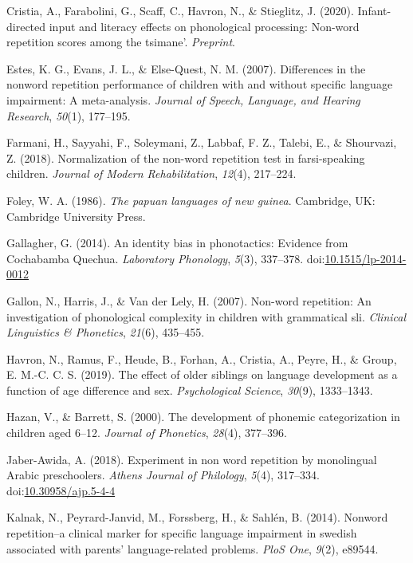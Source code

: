 \documentclass[english,,man,floatsintext]{apa6}
\begin{document}
\hypertarget{ref-cristia2020infant}{}
Cristia, A., Farabolini, G., Scaff, C., Havron, N., \& Stieglitz, J.
(2020). Infant-directed input and literacy effects on phonological
processing: Non-word repetition scores among the tsimane'.
\emph{Preprint}.

\hypertarget{ref-estes2007differences}{}
Estes, K. G., Evans, J. L., \& Else-Quest, N. M. (2007). Differences in
the nonword repetition performance of children with and without specific
language impairment: A meta-analysis. \emph{Journal of Speech, Language,
and Hearing Research}, \emph{50}(1), 177--195.

\hypertarget{ref-farmani2018normalization}{}
Farmani, H., Sayyahi, F., Soleymani, Z., Labbaf, F. Z., Talebi, E., \&
Shourvazi, Z. (2018). Normalization of the non-word repetition test in
farsi-speaking children. \emph{Journal of Modern Rehabilitation},
\emph{12}(4), 217--224.

\hypertarget{ref-foley1986papuan}{}
Foley, W. A. (1986). \emph{The papuan languages of new guinea}.
Cambridge, UK: Cambridge University Press.

\hypertarget{ref-gallagher2014identity}{}
Gallagher, G. (2014). An identity bias in phonotactics: Evidence from
Cochabamba Quechua. \emph{Laboratory Phonology}, \emph{5}(3), 337--378.
doi:\href{https://doi.org/10.1515/lp-2014-0012}{10.1515/lp-2014-0012}

\hypertarget{ref-gallon2007non}{}
Gallon, N., Harris, J., \& Van der Lely, H. (2007). Non-word repetition:
An investigation of phonological complexity in children with grammatical
sli. \emph{Clinical Linguistics \& Phonetics}, \emph{21}(6), 435--455.

\hypertarget{ref-havron2019effect}{}
Havron, N., Ramus, F., Heude, B., Forhan, A., Cristia, A., Peyre, H., \&
Group, E. M.-C. C. S. (2019). The effect of older siblings on language
development as a function of age difference and sex. \emph{Psychological
Science}, \emph{30}(9), 1333--1343.

\hypertarget{ref-hazan2000development}{}
Hazan, V., \& Barrett, S. (2000). The development of phonemic
categorization in children aged 6--12. \emph{Journal of Phonetics},
\emph{28}(4), 377--396.

\hypertarget{ref-jabere2018xperiment}{}
Jaber-Awida, A. (2018). Experiment in non word repetition by monolingual
Arabic preschoolers. \emph{Athens Journal of Philology}, \emph{5}(4),
317--334.
doi:\href{https://doi.org/10.30958/ajp.5-4-4}{10.30958/ajp.5-4-4}

\hypertarget{ref-kalnak2014nonword}{}
Kalnak, N., Peyrard-Janvid, M., Forssberg, H., \& Sahlén, B. (2014).
Nonword repetition--a clinical marker for specific language impairment
in swedish associated with parents' language-related problems.
\emph{PloS One}, \emph{9}(2), e89544.
\end{document}
